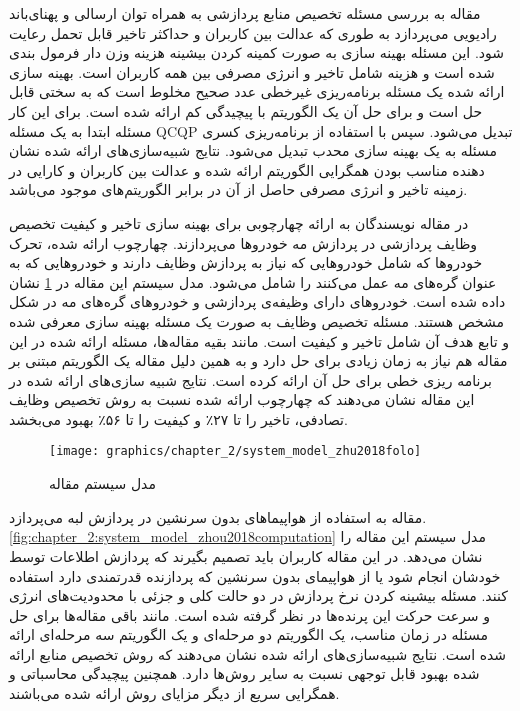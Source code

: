     مقاله \cite{du2018computation} به بررسی مسئله تخصیص منابع پردازشی به همراه توان ارسالی و پهنای‌باند رادیویی می‌پردازد به طوری که عدالت بین کاربران و حداکثر تاخیر قابل تحمل رعایت شود.
    این مسئله بهینه سازی به صورت کمینه کردن بیشینه هزینه وزن دار فرمول بندی شده است و هزینه شامل تاخیر و انرژی مصرفی بین همه کاربران است.
    بهینه سازی ارائه شده یک مسئله برنامه‌ریزی غیرخطی عدد صحیح مخلوط است که به سختی قابل حل است و برای حل آن یک الگوریتم با پیچیدگی کم ارائه شده است.
    برای این کار مسئله ابتدا به یک مسئله QCQP تبدیل می‌شود.
    سپس با استفاده از برنامه‌ریزی کسری مسئله به یک بهینه سازی محدب تبدیل می‌شود.
    نتایج شبیه‌سازی‌های ارائه شده نشان دهنده مناسب بودن همگرایی الگوریتم ارائه شده و عدالت بین کاربران و کارایی در زمینه تاخیر و انرژی مصرفی حاصل از آن در برابر الگوریتم‌های موجود می‌باشد.

    در مقاله \cite{zhu2018folo} نویسندگان به ارائه چهارچوبی برای بهینه سازی تاخیر و کیفیت تخصیص وظایف پردازشی در پردازش مه خودرو‌ها می‌پردازند.
    چهارچوب ارائه شده، تحرک خودرو‌ها که شامل خودرو‌هایی که نیاز به پردازش وظایف دارند و خودرو‌هایی که به عنوان گره‌های مه عمل می‌کنند را شامل می‌شود.
    مدل سیستم این مقاله در \cref{fig:chapter_2:system_model_zhu2018folo} نشان داده شده است.
    خودرو‌های دارای وظیفه‌ی پردازشی و خودرو‌های گره‌های مه در شکل مشخص هستند.
    مسئله تخصیص وظایف به صورت یک مسئله بهینه سازی معرفی شده و تابع هدف آن شامل تاخیر و کیفیت است.
    مانند بقیه مقاله‌ها، مسئله ارائه شده در این مقاله هم نیاز به زمان زیادی برای حل دارد و به همین دلیل مقاله یک الگوریتم مبتنی بر برنامه ریزی خطی برای حل آن ارائه کرده است.
    نتایج شبیه سازی‌های ارائه شده در این مقاله نشان می‌دهند که چهارچوب ارائه شده نسبت به روش تخصیص وظایف تصادفی، تاخیر را تا ۲۷٪ و کیفیت را تا ۵۶٪ بهبود می‌بخشد.

    \begin{figure}[h]
      \centerline{\texttt{[image: graphics/chapter\_2/system\_model\_zhu2018folo]}}
      \caption{مدل سیستم مقاله \cite{zhu2018folo}}
      \label{fig:chapter_2:system_model_zhu2018folo}
    \end{figure}

    مقاله \cite{zhou2018computation} به استفاده از هواپیما‌های بدون سرنشین  در پردازش لبه می‌پردازد.
    \cref{fig:chapter_2:system_model_zhou2018computation} مدل سیستم این مقاله را نشان می‌دهد.
    در این مقاله کاربران باید تصمیم بگیرند که پردازش اطلاعات توسط خودشان انجام شود یا از هواپیمای بدون سرنشین که پردازنده قدرتمندی دارد استفاده کنند.
    مسئله بیشینه کردن نرخ پردازش در دو حالت کلی و جزئی با محدودیت‌های انرژی و سرعت حرکت این پرنده‌ها در نظر گرفته شده است.
    مانند باقی مقاله‌ها برای حل مسئله در زمان مناسب، یک الگوریتم دو مرحله‌ای و یک الگوریتم سه مرحله‌ای ارائه شده است.
    نتایج شبیه‌سازی‌های ارائه شده نشان می‌دهند که روش تخصیص منابع ارائه شده بهبود قابل توجهی نسبت به سایر روش‌ها دارد.
    همچنین پیچیدگی محاسباتی و همگرایی سریع از دیگر مزایای روش ارائه شده می‌باشند.

